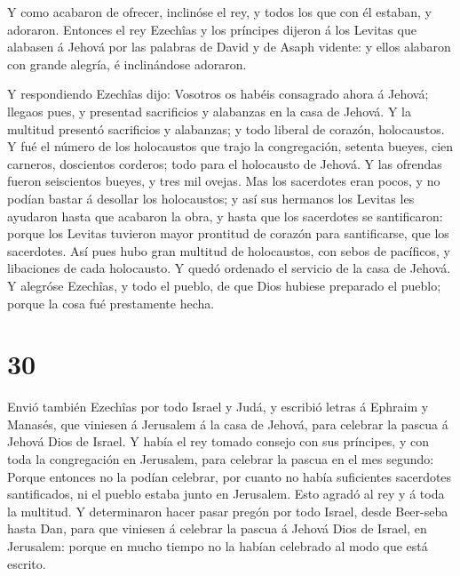  Y como acabaron de ofrecer, inclinóse el rey, y todos los
que con él estaban, y adoraron.  Entonces el rey Ezechîas y
los príncipes dijeron á los Levitas que alabasen á Jehová por las
palabras de David y de Asaph vidente: y ellos alabaron con grande
alegría, é inclinándose adoraron.

 Y respondiendo Ezechîas dijo: Vosotros os habéis
consagrado ahora á Jehová; llegaos pues, y presentad sacrificios y
alabanzas en la casa de Jehová. Y la multitud presentó sacrificios y
alabanzas; y todo liberal de corazón, holocaustos.  Y fué
el número de los holocaustos que trajo la congregación, setenta bueyes,
cien carneros, doscientos corderos; todo para el holocausto de Jehová.
 Y las ofrendas fueron seiscientos bueyes, y tres mil
ovejas.  Mas los sacerdotes eran pocos, y no podían bastar
á desollar los holocaustos; y así sus hermanos los Levitas les ayudaron
hasta que acabaron la obra, y hasta que los sacerdotes se santificaron:
porque los Levitas tuvieron mayor prontitud de corazón para
santificarse, que los sacerdotes.  Así pues hubo gran
multitud de holocaustos, con sebos de pacíficos, y libaciones de cada
holocausto. Y quedó ordenado el servicio de la casa de Jehová.
 Y alegróse Ezechîas, y todo el pueblo, de que Dios hubiese
preparado el pueblo; porque la cosa fué prestamente hecha.

\hypertarget{section-29}{%
\section{30}\label{section-29}}

 Envió también Ezechîas por todo Israel y Judá, y escribió
letras á Ephraim y Manasés, que viniesen á Jerusalem á la casa de
Jehová, para celebrar la pascua á Jehová Dios de Israel.  Y
había el rey tomado consejo con sus príncipes, y con toda la
congregación en Jerusalem, para celebrar la pascua en el mes segundo:
 Porque entonces no la podían celebrar, por cuanto no había
suficientes sacerdotes santificados, ni el pueblo estaba junto en
Jerusalem.  Esto agradó al rey y á toda la multitud.
 Y determinaron hacer pasar pregón por todo Israel, desde
Beer-seba hasta Dan, para que viniesen á celebrar la pascua á Jehová
Dios de Israel, en Jerusalem: porque en mucho tiempo no la habían
celebrado al modo que está escrito.


